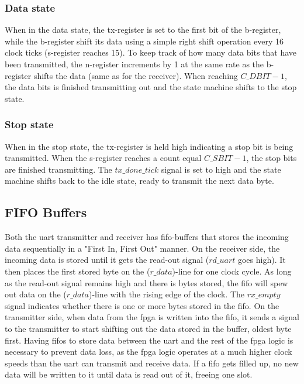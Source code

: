 \documentclass[main.tex]{subfiles}
\begin{document}
\subsubsection{Data state}
When in the data state, the tx-register is set to the first bit of the b-register, while the b-register shift its data using a simple right shift operation every 16 clock ticks (s-register reaches 15). To keep track of how many data bits that have been transmitted, the n-register increments by 1 at the same rate as the b-register shifts the data (same as for the receiver). When reaching $C\_DBIT-1$, the data bits is finished transmitting out and the state machine shifts to the stop state.

\subsubsection{Stop state}
When in the stop state, the tx-register is held high indicating a stop bit is being transmitted. When the s-register reaches a count equal $C\_SBIT - 1$, the stop bits are finished transmitting. The $tx\_done\_tick$ signal is set to high and the state machine shifts back to the idle state, ready to transmit the next data byte.

\subsection{FIFO Buffers}
Both the \gls{uart} transmitter and receiver has \gls{fifo}-buffers that stores the incoming data sequentially in a "First In, First Out" manner. On the receiver side, the incoming data is stored until it gets the read-out signal ($rd\_uart$ goes high). It then places the first stored byte on the ($r\_data$)-line for one clock cycle. As long as the read-out signal remains high and there is bytes stored, the \gls{fifo} will spew out data on the ($r\_data$)-line with the rising edge of the clock. The $rx\_empty$ signal indicates whether there is one or more bytes stored in the \gls{fifo}. On the transmitter side, when data from the \gls{fpga} is written into the \gls{fifo}, it sends a signal to the transmitter to start shifting out the data stored in the buffer, oldest byte first. Having \glspl{fifo} to store data between the \gls{uart} and the rest of the \gls{fpga} logic is necessary to prevent data loss, as the \gls{fpga} logic operates at a much higher clock speeds than the \gls{uart}  can transmit and receive data. If a \gls{fifo} gets filled up, no new data will be written to it until data is read out of it, freeing one slot.
\end{document}
